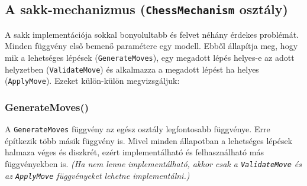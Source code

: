 \documentclass[twoside, a4paper, 12pt]{book}
\begin{document}
\subsection{A sakk-mechanizmus (\texttt{ChessMechanism} osztály)}

A sakk implementációja sokkal bonyolultabb és felvet néhány érdekes problémát. Minden függvény első bemenő paramétere egy modell. Ebből állapítja meg, hogy mik a lehetséges lépések (\texttt{GenerateMoves}), egy megadott lépés helyes-e az adott helyzetben (\texttt{ValidateMove}) és alkalmazza a megadott lépést ha helyes (\texttt{ApplyMove}). Ezeket külön-külön megvizsgáljuk:

\subsubsection{GenerateMoves()}
A \texttt{GenerateMoves} függvény az egész osztály legfontosabb függvénye. Erre építkezik több másik függvény is. Mivel minden állapotban a lehetséges lépések halmaza véges és diszkrét, ezért implementálható és felhasználható más függvényekben is. \textit{(Ha nem lenne implementálható, akkor csak a \texttt{ValidateMove} és az \texttt{ApplyMove} függvényeket lehetne implementálni.)}
\end{document}

